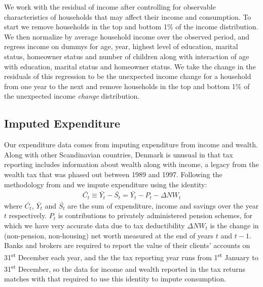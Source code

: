 \documentclass[titlepage]{\econtex}\newcommand{\texname}{ConsumptionHeterogeneity}
\begin{document}
We work with the residual of income after controlling for observable characteristics of households that may affect their income and consumption. To start we remove households in the top and bottom 1\% of the income distribution. We then normalize by average household income over the observed period, and regress income on dummys for age, year, highest level of education, marital status, homeowner status and number of children along with interaction of age with education, marital status and homeowner status. We take the change in the residuals of this regression to be the unexpected income change for a household from one year to the next and remove households in the top and bottom 1\% of the unexpected income \textit{change} distribution.

\subsection{Imputed Expenditure} \label{cons_imputation}
Our expenditure data comes from imputing expenditure from income and wealth. Along with other Scandinavian countries, Denmark is unusual in that tax reporting includes information about wealth along with income, a legacy from the wealth tax that was phased out between 1989 and 1997. Following the methodology from \cite{browning_imputing_2003} and \cite{fagereng_imputing_2015} we impute expenditure using the identity:
\begin{align*}
\bar{C_t} \equiv \bar{Y_t} - \bar{S_t} = \bar{Y_t} - P_t - \Delta NW_t 
\end{align*}
where $\bar{C_t}$, $\bar{Y_t}$ and $\bar{S_t}$  are the sum of expenditure, income and savings over the year $t$ respectively. $P_t$ is contributions to privately administered pension schemes, for which we have very accurate data due to tax deductibility $\Delta NW_t$ is the change in (non-pension, non-housing) net worth measured at the end of years $t$ and $t-1$. Banks and brokers are required to report the value of their clients' accounts on 31\textsuperscript{st} December each year, and the the tax reporting year runs from 1\textsuperscript{st} January to 31\textsuperscript{st} December, so the data for income and wealth reported in the tax returns matches with that required to use this identity to impute consumption. 
\end{document}
